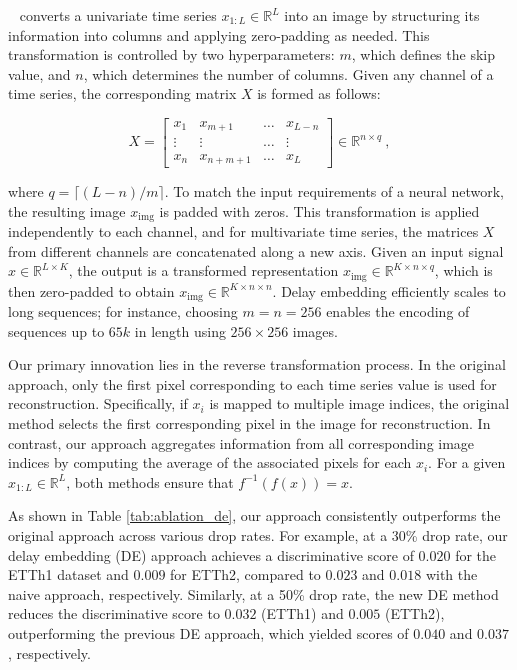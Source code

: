 \documentclass{article}
\theoremstyle{plain}
\theoremstyle{definition}
\theoremstyle{remark}
\begin{document}
{~\cite{takens2006detecting} converts a univariate time series \( x_{1:L} \in \mathbb{R}^L \) into an image by structuring its information into columns and applying zero-padding as needed. This transformation is controlled by two hyperparameters: \( m \), which defines the skip value, and \( n \), which determines the number of columns. Given any channel of a time series, the corresponding matrix \( X \) is formed as follows:

\[
X = \begin{bmatrix}
    x_1 & x_{m+1} & \dots & x_{L-n} \\
    \vdots & \vdots & \dots & \vdots \\
    x_n & x_{n+m+1} & \dots & x_L
\end{bmatrix} \in \mathbb{R}^{n \times q} \ ,
\]

where \( q = \lceil (L-n)/m \rceil \). To match the input requirements of a neural network, the resulting image \( x_{\text{img}} \) is padded with zeros. This transformation is applied independently to each channel, and for multivariate time series, the matrices \( X \) from different channels are concatenated along a new axis. Given an input signal \( x \in \mathbb{R}^{L \times K} \), the output is a transformed representation \( x_{\text{img}} \in \mathbb{R}^{K \times n \times q} \), which is then zero-padded to obtain \( x_{\text{img}} \in \mathbb{R}^{K \times n \times n} \). Delay embedding efficiently scales to long sequences; for instance, choosing \( m=n=256 \) enables the encoding of sequences up to \( 65k \) in length using \( 256 \times 256 \) images.

Our primary innovation lies in the reverse transformation process. In the original approach, only the first pixel corresponding to each time series value is used for reconstruction. Specifically, if \( x_i \) is mapped to multiple image indices, the original method selects the first corresponding pixel in the image for reconstruction. In contrast, our approach aggregates information from all corresponding image indices by computing the average of the associated pixels for each \( x_i \). For a given \( x_{1:L} \in \mathbb{R}^L \), both methods ensure that \( f^{-1}(f(x)) = x \).

As shown in Table \ref{tab:ablation_de}, our approach consistently outperforms the original approach across various drop rates. For example, at a 30\% drop rate, our delay embedding (DE) approach achieves a discriminative score of $0.020$ for the ETTh1 dataset and $0.009$ for ETTh2, compared to $0.023$ and $0.018$ with the naive approach, respectively. Similarly, at a 50\% drop rate, the new DE method reduces the discriminative score to $0.032$ (ETTh1) and $0.005$ (ETTh2), outperforming the previous DE approach, which yielded scores of $0.040$ and $0.037$, respectively.

}
\end{document}

